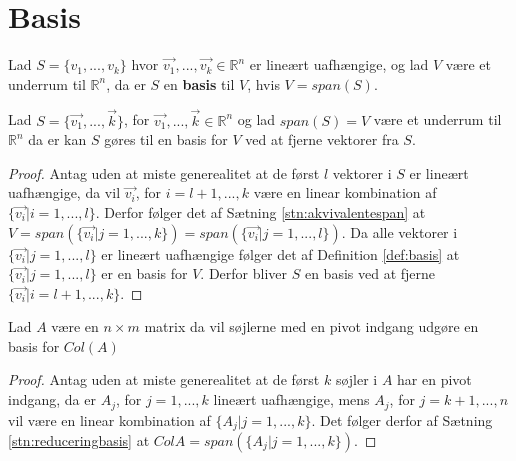 \section{Basis}

\begin{defn}
Lad $S =\{v_1,...,v_k\}$ hvor $\vec{v_1},...,\vec{v_k} \in \mathds{R}^n$ er lineært uafhængige, og lad $V$ være et underrum til $\mathds{R}^n$, da er $S$ en \textbf{basis} til $V$, hvis $V = span(S)$.
\label{def:basis}
\end{defn}


\begin{stn}
Lad $S=\{\vec{v_1}, ..., \vec{k}\}$, for $\vec{v_1}, ..., \vec{k} \in \mathds{R}^n$ og lad $span(S) = V$ være et underrum til $\mathds{R}^n$ da er kan $S$ gøres til en basis for $V$ ved at fjerne vektorer fra $S$.
\label{stn:reduceringbasis}
\end{stn}

\begin{proof}
Antag uden at miste generealitet at de først $l$ vektorer i $S$ er  lineært uafhængige, da vil $\vec{v_i}$, for $i = l+1,...,k$ være en linear kombination af $\{\vec{v_i} | i = 1,...,l\}$. 
Derfor følger det af Sætning \ref{stn:akvivalentespan} at $V = span(\{\vec{v_i}| j =1,...,k\}) =span(\{\vec{v_i}| j=1,...,l\})$.
Da alle vektorer i $\{\vec{v_i}| j=1,...,l\}$ er lineært uafhængige følger det af Definition \ref{def:basis} at $\{\vec{v_i}| j=1,...,l\}$ er en basis for $V$. 
Derfor bliver $S$ en basis ved at fjerne $\{\vec{v_i}| i = l+1,...,k\}$.
\end{proof}

\begin{kor}
Lad $A$ være en $n \times m$ matrix da vil søjlerne med en pivot indgang udgøre en basis for $Col (A)$
\end{kor}

\begin{proof}
Antag uden at miste generealitet at de først $k$ søjler i $A$ har en pivot indgang, da er $A_j$, for $j=1,...,k$ lineært uafhængige, mens $A_j$, for $j = k+1,...,n$ vil være en linear kombination af $\{A_j | j = 1,...,k\}$. 
Det følger derfor af Sætning \ref{stn:reduceringbasis} at $Col A = span(\{A_j| j=1,...,k\})$.
\end{proof}

